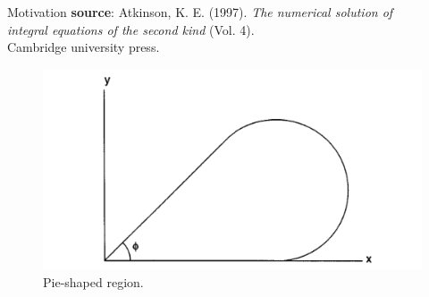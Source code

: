 \documentclass{beamer}
\begin{document}
\begin{frame}[t,fragile]{Motivation}
  \hspace{10pt}
   \textbf{source}: Atkinson, K. E. (1997).
    \emph{The numerical solution of \\
  \hspace{10pt}
    integral equations of the second kind} (Vol. 4). \\
  \hspace{10pt}
    Cambridge university press.
\begin{figure}
    \centering
    \vspace{-55pt}
    \includegraphics[width=.3\textwidth]{pie.png}
    \vspace{-8pt}
    \caption{\footnotesize Pie-shaped region.}
\end{figure}
\end{frame}
\end{document}
